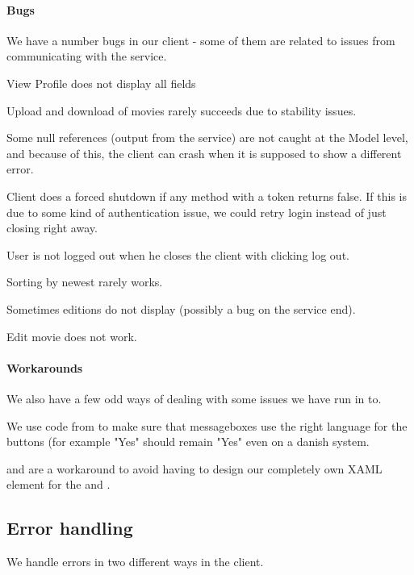 \paragraph{Bugs} We have a number bugs in our client - some of them are related to issues from communicating with the service.
\begin{my_itemize}
\item View Profile does not display all fields
\item Upload and download of movies rarely succeeds due to stability issues.
\item Some null references (output from the service) are not caught at the Model level, and because of this, the client can crash when it is supposed to show a different error.
\item Client does a forced shutdown if any method with a token returns false. If this is due to some kind of authentication issue, we could retry login instead of just closing right away.
\item User is not logged out when he closes the client with clicking log out.
\item Sorting by newest rarely works.
\item Sometimes editions do not display (possibly a bug on the service end).
\item Edit movie does not work.
\end{my_itemize}

\paragraph{Workarounds} We also have a few odd ways of dealing with some issues we have run in to.
\begin{my_itemize}
\item We use code from \cite{CODE:MSGBOX} to make sure that messageboxes use the right language for the buttons (for example "Yes" should remain "Yes" even on a danish system.
\item {} and  are a workaround to avoid having to design our completely own XAML element for the  and .
\end{my_itemize}

\subsection{Error handling}
\label{Implementation_Client_Error}
We handle errors in two different ways in the client.
